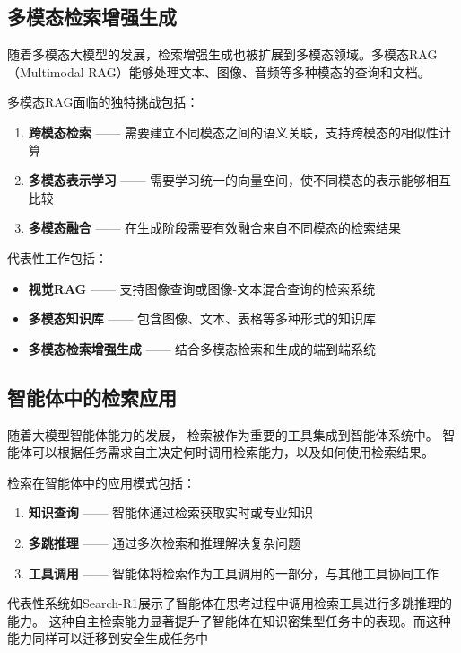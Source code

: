 \subsection{多模态检索增强生成}

随着多模态大模型的发展，检索增强生成也被扩展到多模态领域。多模态RAG（Multimodal RAG）能够处理文本、图像、音频等多种模态的查询和文档。

多模态RAG面临的独特挑战包括\supercite{DBLP:journals/corr/abs-2504-08748}：
\begin{enumerate}
    \item \textbf{跨模态检索} —— 需要建立不同模态之间的语义关联，支持跨模态的相似性计算
    \item \textbf{多模态表示学习} —— 需要学习统一的向量空间，使不同模态的表示能够相互比较
    \item \textbf{多模态融合} —— 在生成阶段需要有效融合来自不同模态的检索结果
\end{enumerate}

代表性工作包括：
\begin{itemize}
    \item \textbf{视觉RAG} —— 支持图像查询或图像-文本混合查询的检索系统
    \item \textbf{多模态知识库} —— 包含图像、文本、表格等多种形式的知识库
    \item \textbf{多模态检索增强生成} —— 结合多模态检索和生成的端到端系统
\end{itemize}

\subsection{智能体中的检索应用}

随着大模型智能体能力的发展\supercite{DBLP:conf/nips/SchickDDRLHZCS23}，
检索被作为重要的工具集成到智能体系统中\supercite{Wang_2024}。
智能体可以根据任务需求自主决定何时调用检索能力，以及如何使用检索结果。

检索在智能体中的应用模式包括\supercite{Wang_2024}：
\begin{enumerate}
    \item \textbf{知识查询} —— 智能体通过检索获取实时或专业知识
    \item \textbf{多跳推理} —— 通过多次检索和推理解决复杂问题
    \item \textbf{工具调用} —— 智能体将检索作为工具调用的一部分，与其他工具协同工作
\end{enumerate}

代表性系统如Search-R1\supercite{DBLP:journals/corr/abs-2503-09516}展示了智能体在思考过程中调用检索工具进行多跳推理的能力。
这种自主检索能力显著提升了智能体在知识密集型任务中的表现。而这种能力同样可以迁移到安全生成任务中

